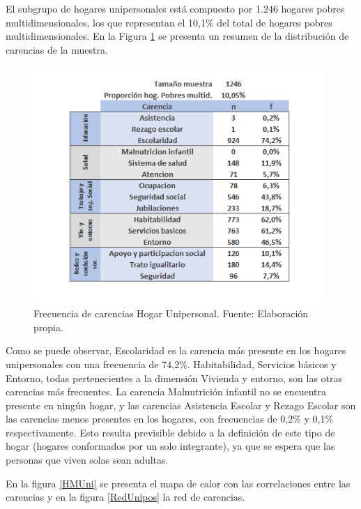 \documentclass[12pt,letterpaper,spanish]{article}
\begin{document}
El subgrupo de hogares unipersonales está compuesto por 1.246 hogares pobres multidimensionales, los que representan el 10,1\% del total de hogares pobres multidimensionales. En la Figura \ref{freHUni} se presenta un resumen de la distribución de carencias de la muestra.
\begin{figure}[H]
    \centering
        \includegraphics[height=9cm]{HOGARES/tabla_unip.png}
    \caption{Frecuencia de carencias Hogar Unipersonal. Fuente: Elaboración propia.}
    \label{freHUni}
\end{figure}
Como se puede observar, Escolaridad es la carencia más presente en los hogares unipersonales con una frecuencia de 74,2\%. Habitabilidad, Servicios básicos y Entorno, todas pertenecientes a la dimensión Vivienda y entorno, son las otras carencias más frecuentes. La carencia Malnutrición infantil no se encuentra presente en ningún hogar, y las carencias Asistencia Escolar y Rezago Escolar son las carencias menos presentes en los hogares, con frecuencias de 0,2\% y 0,1\% respectivamente. Esto resulta previsible debido a la definición de este tipo de hogar (hogares conformados por un solo integrante), ya que se espera que las personas que viven solas sean adultas. 

En la figura \ref{HMUni} se presenta el mapa de calor con las correlaciones entre las carencias y en la figura \ref{RedUnipos} la red de carencias.
\end{document}
